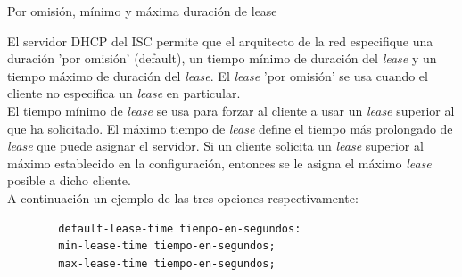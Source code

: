 \begin{frame}{Por omisión, mínimo y máxima duración
de lease}
   
    El servidor DHCP del ISC permite que el arquitecto de la red especifique
    una duración 'por omisión' (default), un tiempo mínimo de duración del \textit{lease} y
    un tiempo máximo de duración del \textit{lease}. El \textit{lease} 'por
    omisión' se usa cuando el cliente no especifica un \textit{lease} en
    particular.\\[0.2cm]
    
    El tiempo mínimo de \textit{lease} se usa para forzar al
    cliente a usar un \textit{lease} superior al que ha solicitado. El máximo
    tiempo de \textit{lease} define el tiempo más prolongado de \textit{lease}
    que puede asignar el servidor. Si un cliente solicita un \textit{lease}
    superior al máximo establecido en la configuración, entonces se le asigna
    el máximo \textit{lease} posible a dicho cliente.\\[0.2cm]

    A continuación un ejemplo de las tres opciones respectivamente:

    \begin{verbatim}
        default-lease-time tiempo-en-segundos:
        min-lease-time tiempo-en-segundos;
        max-lease-time tiempo-en-segundos;
    \end{verbatim}

\end{frame}

